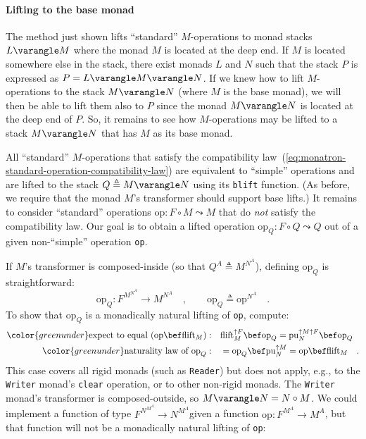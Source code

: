 \paragraph{Lifting to the base monad}

The method just shown lifts \textsf{``}standard\textsf{''} $M$-operations to monad
stacks $L\varangle M$ where the monad $M$ is located at the deep
end. If $M$ is located somewhere else in the stack, there exist monads
$L$ and $N$ such that the stack $P$ is expressed as $P=L\varangle M\varangle N$.
If we knew how to lift $M$-operations to the stack $M\varangle N$
(where $M$ is the base monad), we will then be able to lift them
also to $P$ since the monad $M\varangle N$ is located at the deep
end of $P$. So, it remains to see how $M$-operations may be lifted
to a stack $M\varangle N$ that has $M$ as its base monad.

All \textsf{``}standard\textsf{''} $M$-operations that satisfy the compatibility
law~(\ref{eq:monatron-standard-operation-compatibility-law}) are
equivalent to \textsf{``}simple\textsf{''} operations and are lifted to the stack
$Q\triangleq M\varangle N$ using its \lstinline!blift! function.
(As before, we require that the monad $M$\textsf{'}s transformer should support
base lifts.) It remains to consider \textsf{``}standard\textsf{''} operations $\text{op}:F\circ M\leadsto M$
that do \emph{not} satisfy the compatibility law. Our goal is to obtain
a lifted operation $\text{op}_{Q}:F\circ Q\leadsto Q$ out of a given
non-\textsf{``}simple\textsf{''} operation \lstinline!op!.

If $M$\textsf{'}s transformer is composed-inside (so that $Q^{A}\triangleq M^{N^{A}}$),
defining $\text{op}_{Q}$ is straightforward:
\[
\text{op}_{Q}:F^{M^{N^{A}}}\rightarrow M^{N^{A}}\quad,\quad\quad\text{op}_{Q}\triangleq\text{op}^{N^{A}}\quad.
\]
To show that $\text{op}_{Q}$ is a monadically natural lifting of
\lstinline!op!, compute:
\begin{align*}
{\color{greenunder}\text{expect to equal }(\text{op}\bef\text{flift}_{M}):}\quad & \text{flift}_{M}^{\uparrow F}\bef\text{op}_{Q}=\text{pu}_{N}^{\uparrow M\uparrow F}\bef\text{op}_{Q}\\
{\color{greenunder}\text{naturality law of }\text{op}_{Q}:}\quad & =\text{op}_{Q}\bef\text{pu}_{N}^{\uparrow M}=\text{op}\bef\text{flift}_{M}\quad.
\end{align*}
This case covers all rigid monads (such as \lstinline!Reader!) but
does not apply, e.g., to the \lstinline!Writer! monad\textsf{'}s \lstinline!clear!
operation, or to other non-rigid monads. The \lstinline!Writer! monad\textsf{'}s
transformer is composed-outside, so $M\varangle N=N\circ M$. We could
implement a function of type $F^{N^{M^{A}}}\rightarrow N^{M^{A}}$given
a function $\text{op}:F^{M^{A}}\rightarrow M^{A}$, but that function
will not be a monadically natural lifting of \lstinline!op!:

